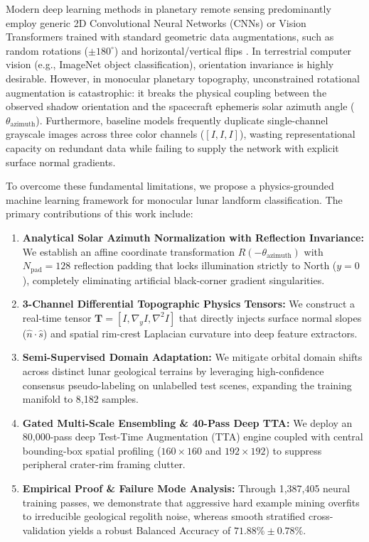 \documentclass[10pt,journal,compsoc]{IEEEtran}
\theoremstyle{definition}
\begin{document}
Modern deep learning methods in planetary remote sensing predominantly employ generic 2D Convolutional Neural Networks (CNNs) or Vision Transformers trained with standard geometric data augmentations, such as random rotations ($\pm 180^\circ$) and horizontal/vertical flips \cite{he2016deep, liu2022convnet, shorten2019survey}. In terrestrial computer vision (e.g., ImageNet object classification), orientation invariance is highly desirable. However, in monocular planetary topography, unconstrained rotational augmentation is catastrophic: it breaks the physical coupling between the observed shadow orientation and the spacecraft ephemeris solar azimuth angle ($\theta_{\text{azimuth}}$). Furthermore, baseline models frequently duplicate single-channel grayscale images across three color channels ($[I, I, I]$), wasting representational capacity on redundant data while failing to supply the network with explicit surface normal gradients.

To overcome these fundamental limitations, we propose a physics-grounded machine learning framework for monocular lunar landform classification. The primary contributions of this work include:

\begin{enumerate}
    \item \textbf{Analytical Solar Azimuth Normalization with Reflection Invariance:} We establish an affine coordinate transformation $R(-\theta_{\text{azimuth}})$ with $N_{\text{pad}}=128$ reflection padding that locks illumination strictly to North ($y=0$), completely eliminating artificial black-corner gradient singularities.
    \item \textbf{3-Channel Differential Topographic Physics Tensors:} We construct a real-time tensor $\mathbf{T} = [I, \nabla_y I, \nabla^2 I]$ that directly injects surface normal slopes ($\hat{n} \cdot \hat{s}$) and spatial rim-crest Laplacian curvature into deep feature extractors.
    \item \textbf{Semi-Supervised Domain Adaptation:} We mitigate orbital domain shifts across distinct lunar geological terrains by leveraging high-confidence consensus pseudo-labeling on unlabelled test scenes, expanding the training manifold to 8,182 samples.
    \item \textbf{Gated Multi-Scale Ensembling \& 40-Pass Deep TTA:} We deploy an 80,000-pass deep Test-Time Augmentation (TTA) engine coupled with central bounding-box spatial profiling ($160\times160$ and $192\times192$) to suppress peripheral crater-rim framing clutter.
    \item \textbf{Empirical Proof \& Failure Mode Analysis:} Through 1,387,405 neural training passes, we demonstrate that aggressive hard example mining overfits to irreducible geological regolith noise, whereas smooth stratified cross-validation yields a robust Balanced Accuracy of $71.88\% \pm 0.78\%$.
\end{enumerate}
\end{document}
